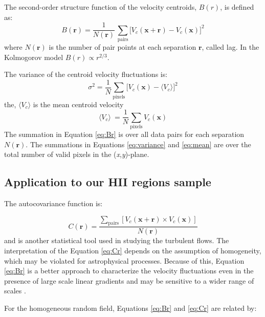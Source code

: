 \documentclass[fleqn,usenatbib, useAMS, a4paper]{mnras}
\begin{document}
The second-order structure function of the velocity centroids, $B(r)$, is defined as:
%
\begin{equation}\label{eq:Br}
  B(\boldsymbol{r}) = \dfrac{1}{N(\boldsymbol{r})}
  \,
  \sum_{\text{pairs}} \bigl[
  V_{c}(\boldsymbol{x} + \boldsymbol{r}) - V_{c}(\boldsymbol{x})
  \bigr]^{2}
\end{equation}
%
where $N(\boldsymbol{r})$ is the number of pair points at each separation \(\boldsymbol{r}\), called lag. 
In the Kolmogorov model \(B(r) \propto r^{2/3}\).

The variance of the centroid velocity fluctuations is:
%
\begin{equation}\label{eq:variance}
\sigma^2  = \frac{1}{N} \sum_{\text{pixels}} \bigl[ V_c (\boldsymbol{x}) -\langle V_ c\rangle  \bigr]^2
\end{equation}
%
the, \(\langle V_c \rangle \) is the mean centroid velocity
%
\begin{equation}\label{eq:mean}
\langle V_c \rangle \  = \frac{1}{N} \sum_{\text{pixels}} V_c (\boldsymbol{x})
\end{equation}
%
The summation in Equation \ref{eq:Br} is over all data pairs for each separation \(N(\boldsymbol{r})\).
The summations in Equations \ref{eq:variance} and \ref{eq:mean} are over the total number of valid pixels in the (\textit{x},\textit{y})-plane.

\subsection{Application to our HII regions sample}\label{sec:apply}

The autocovariance function is:

\begin{equation}\label{eq:Cr}
C(\boldsymbol{r}) = \dfrac{\sum_{\text{pairs}}[V_{c}(\boldsymbol{x} + \boldsymbol{r}) \times V_{c}(\boldsymbol{x}) ]} {N(\boldsymbol{r})}
\end{equation}
%
and is another statistical tool used in studying the turbulent flows.
The interpretation of the Equation \ref{eq:Cr} depends on the assumption of homogeneity, which may be violated for astrophysical processes.
Because of this, Equation \ref{eq:Br} is a better approach to characterize the velocity fluctuations even in the presence of large scale linear gradients and may be sensitive to a wider range of scales \citep{1984ApJ...277..556S}.

For the homogeneous random field, Equations \ref{eq:Br} and \ref{eq:Cr} are related by:
\end{document}
